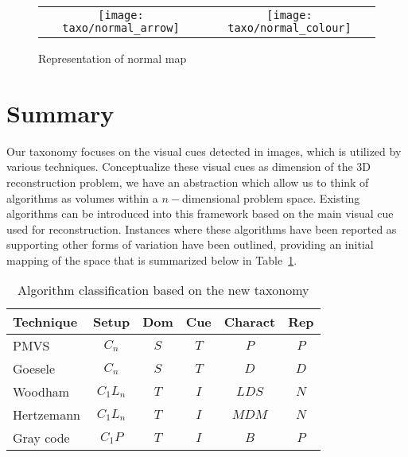 \begin{figure}[h]
\centering
\begin{tabular}{cc}
\texttt{[image: taxo/normal\_arrow]}&
\texttt{[image: taxo/normal\_colour]}\\
\end{tabular}
\caption{Representation of normal map}
\label{fig:normal_map}
\end{figure}

\section{Summary}
Our taxonomy focuses on the visual cues detected in images, which is utilized by various techniques. Conceptualize these visual cues as dimension of the 3D reconstruction problem, we have an abstraction which allow us to think of algorithms as volumes within a $n-$dimensional problem space. Existing algorithms can be introduced into this framework based on the main visual cue used for reconstruction. Instances where these algorithms have been reported as supporting other forms of variation have been outlined, providing an initial mapping of the space that is summarized below in Table~\ref{tab:algo_label}.
\begin{table}[h]
  \centering
  \begin{tabular}{l*{5}{c}}
  \hline
  \textbf{Technique} & Setup & Dom & Cue & Charact & Rep\\
  \hline
  PMVS & $C_n$ & $S$ & $T$ & $P$ & $P$\\
  Goesele & $C_n$ & $S$ & $T$ & $D$ & $D$\\
  Woodham & $C_1L_n$ & $T$ & $I$ & $LDS$ & $N$\\
  Hertzemann & $C_1L_n$ & $T$ & $I$ & $MDM$ & $N$\\
  Gray code & $C_1P$ & $T$ & $I$ & $B$ & $P$\\
  \hline
  \end{tabular}
  \label{tab:algo_label}
  \caption{Algorithm classification based on the new taxonomy}
\end{table}

